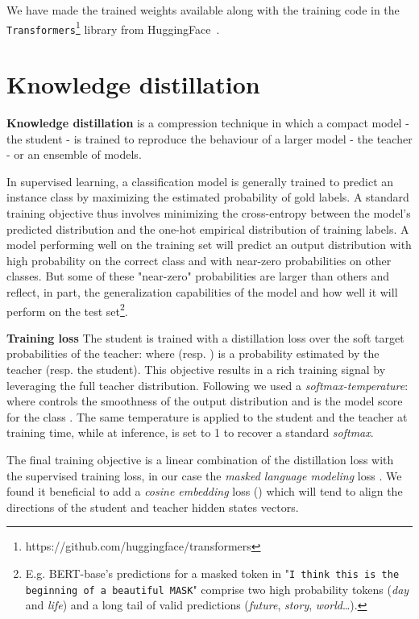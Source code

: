 \documentclass{article}
\begin{document}
We have made the trained weights available along with the training code in the \texttt{Transformers}\footnote{https://github.com/huggingface/transformers} library from HuggingFace~\citep{wolf2019transformers}.

\section{Knowledge distillation}

\textbf{Knowledge distillation} \citep{Bucila2006ModelC, Hinton2015DistillingTK} is a compression technique in which a compact model - the student - is trained to reproduce the behaviour of a larger model - the teacher - or an ensemble of models.

In supervised learning, a classification model is generally trained to predict an instance class by maximizing the estimated probability of gold labels. A standard training objective thus involves minimizing the cross-entropy between the model's predicted distribution and the one-hot empirical distribution of training labels. A model performing well on the training set will predict an output distribution with high probability on the correct class and with near-zero probabilities on other classes. But some of these "near-zero" probabilities are larger than others and reflect, in part, the generalization capabilities of the model and how well it will perform on the test set\footnote{E.g. BERT-base's predictions for a masked token in "\texttt{I think this is the beginning of a beautiful \lbrack MASK\rbrack}" comprise two high probability tokens (\textit{day} and \textit{life}) and a long tail of valid predictions (\textit{future}, \textit{story}, \textit{world}\dots).
}.

\textbf{Training loss} The student is trained with a distillation loss over the soft target probabilities of the teacher:  where  (resp. ) is a probability estimated by the teacher (resp. the student). This objective results in a rich training signal by leveraging the full teacher distribution. Following \citet{Hinton2015DistillingTK} we used a \textit{softmax-temperature}:  where  controls the smoothness of the output distribution and  is the model score for the class . The same temperature  is applied to the student and the teacher at training time, while at inference,  is set to 1 to recover a standard \textit{softmax}.

The final training objective is a linear combination of the distillation loss  with the supervised training loss, in our case the \textit{masked language modeling} loss  \citep{Devlin2018BERTPO}. We found it beneficial to add a \textit{cosine embedding} loss () which will tend to align the directions of the student and teacher hidden states vectors.
\end{document}
